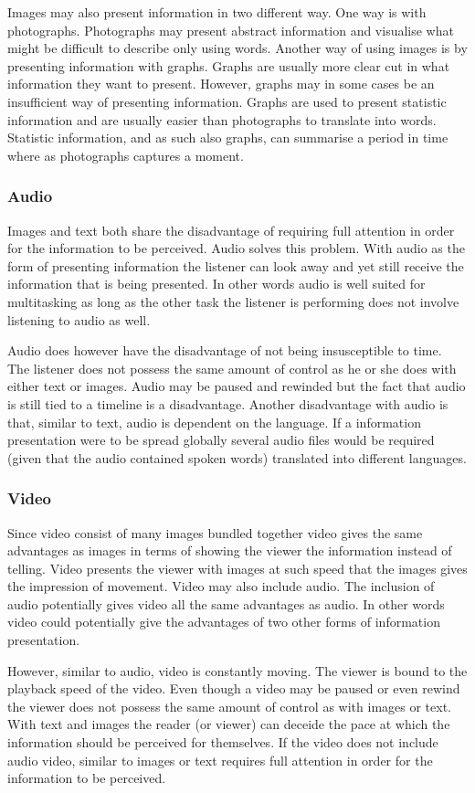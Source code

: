 Images may also present information in two different way. One way is with photographs. Photographs may present abstract information and visualise what might be difficult to describe only using words. Another way of using images is by presenting information with graphs. Graphs are usually more clear cut in what information they want to present. However, graphs may in some cases be an insufficient way of presenting information. Graphs are used to present statistic information and are usually easier than photographs to translate into words. Statistic information, and as such also graphs, can summarise a period in time where as photographs captures a moment. 

\subsubsection{Audio}
Images and text both share the disadvantage of requiring full attention in order for the information to be perceived. Audio solves this problem. With audio as the form of presenting information the listener can look away and yet still receive the information that is being presented. In other words audio is well suited for multitasking as long as the other task the listener is performing does not involve listening to audio as well.

Audio does however have the disadvantage of not being insusceptible to time. The listener does not possess the same amount of control as he or she does with either text or images. Audio may be paused and rewinded but the fact that audio is still tied to a timeline is a disadvantage. Another disadvantage with audio is that, similar to text, audio is dependent on the language. If a information presentation were to be spread globally several audio files would be required (given that the audio contained spoken words) translated into different languages.

\subsubsection{Video}
Since video consist of many images bundled together video gives the same advantages as images in terms of showing the viewer the information instead of telling. Video presents the viewer with images at such speed that the images gives the impression of movement. Video may also include audio. The inclusion of audio potentially gives video all the same advantages as audio. In other words video could potentially give the advantages of two other forms of information presentation.

However, similar to audio, video is constantly moving. The viewer is bound to the playback speed of the video. Even though a video may be paused or even rewind the viewer does not possess the same amount of control as with images or text. With text and images the reader (or viewer) can deceide the pace at which the information should be perceived for themselves. If the video does not include audio video, similar to images or text requires full attention in order for the information to be perceived.